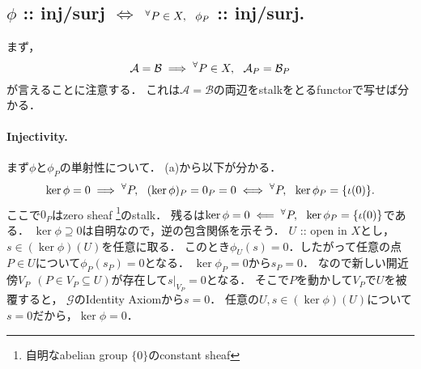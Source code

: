 \documentclass[a4paper]{jsarticle}
\newcommand{\shA}{\mathcal{A}}
\newcommand{\shB}{\mathcal{B}}
\newcommand{\shF}{\mathcal{F}}
\newcommand{\shG}{\mathcal{G}}
\begin{document}
    \subsection{$\phi$ :: inj/surj $\iff$ ${}^{\forall} P \in X,~~ \phi_P$ :: inj/surj.}
    まず，
    \[ \shA=\shB \implies \Forall{P \in X} \shA_P=\shB_P \]
    が言えることに注意する．
    これは$\shA=\shB$の両辺をstalkをとるfunctorで写せば分かる．

    \paragraph{Injectivity.}
    まず$\phi$と$\phi_P$の単射性について．
    (a)から以下が分かる．
    \[ \ker \phi=0 \implies {}^{\forall} P,~~ (\ker \phi)_P=0_P=0 \iff {}^{\forall} P,~~ \ker \phi_P=\{\iota(0)\}. \]
    ここで$0_P$はzero sheaf \footnote{自明なabelian group $\{0\}$のconstant sheaf}のstalk．
    残るは$\ker \phi=0 \impliedby {}^{\forall} P,~~ \ker \phi_P=\{\iota(0)\}$である．
    $\ker \phi \supseteq 0$は自明なので，逆の包含関係を示そう．
    $U$ :: open in $X$とし，$s \in (\ker \phi)(U)$を任意に取る．
    このとき$\phi_U(s)=0$．したがって任意の点$P \in U$について$\phi_P(s_P)=0$となる．
    $\ker \phi_P=0$から$s_P=0$．
    なので新しい開近傍$V_P ~~(P \in V_P \subseteq U)$が存在して$s|_{V_P}=0$となる．
    そこで$P$を動かして$V_P$で$U$を被覆すると，
    $\shG$のIdentity Axiomから$s=0$．
    任意の$U, s \in (\ker \phi)(U)$について$s=0$だから，$\ker \phi=0$．
\end{document}
